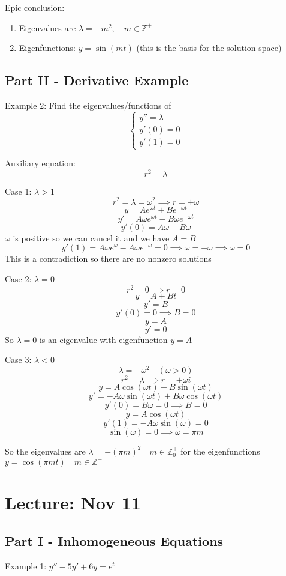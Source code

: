 \documentclass[12pt]{article}
\begin{document}
Epic conclusion:
\begin{enumerate}
    \item Eigenvalues are $\lambda = -m^2, \quad m \in \mathbb{Z}^+$
    \item Eigenfunctions: $y = \sin (mt)$ (this is the basis for the solution space)
\end{enumerate}

\subsection*{Part II - Derivative Example}
Example 2: Find the eigenvalues/functions of 
\[\begin{cases}
    y'' = \lambda\\
    y'(0) = 0\\
    y'(1) = 0
\end{cases}\] 

Auxiliary equation:
\[r^2 = \lambda\]

Case 1: $\lambda > 1$
\[r^2 = \lambda = \omega^2 \implies r = \pm \omega\]
\[y = Ae^{\omega t} + Be^{-\omega t}\]
\[y' = A\omega e^{\omega t} -B\omega e^{-\omega t} \]
\[y'(0) = A\omega -B\omega\]
$\omega$ is positive so we can cancel it and we have $A= B$
\[y'(1) = A\omega e^\omega - A\omega e^{-\omega} = 0 \implies \omega = -\omega \implies \omega = 0\]
This is a contradiction so there are no nonzero solutions

Case 2: $\lambda = 0$
\[r^2 = 0 \implies r = 0\]
\[y = A + Bt\]
\[y' = B\]
\[y'(0) = 0 \implies B = 0\]
\[y = A\]
\[y' = 0\]
So $\lambda = 0$ is an eigenvalue with eigenfunction $y = A$ 

Case 3: $\lambda < 0$
\[\lambda = -\omega^2 \quad (\omega > 0)\]
\[r^2 = \lambda \implies r = \pm \omega i\]
\[y = A \cos (\omega t) + B \sin (\omega t)\]
\[y' = -A \omega \sin (\omega t) + B \omega \cos (\omega t) \]
\[y'(0) = B \omega = 0 \implies B = 0\]
\[y = A \cos (\omega t)\]
\[y'(1) = -A\omega \sin (\omega) = 0\]
\[\sin (\omega) = 0 \implies \omega = \pi m \]

So the eigenvalues are $\lambda = -(\pi m)^2 \quad m \in \mathbb{Z}^+_0$ for the eigenfunctions $y = \cos (\pi m t) \quad m \in \mathbb{Z}^+$

\section{Lecture: Nov 11}
\subsection*{Part I - Inhomogeneous Equations}
Example 1: $y'' - 5y' + 6y = e^t$
\end{document}
